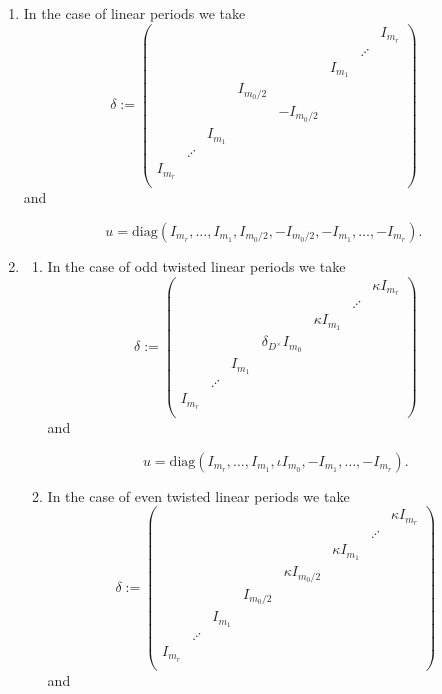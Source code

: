 \documentclass[11pt,letterpaper]{amsart}
\def\k{\kappa}
\def\diag{\mathrm{diag}}
\theoremstyle{plain}
\numberwithin{equation}{section}
\begin{document}
\begin{enumerate}[1)]
\item In the case of linear periods we take 
\[\delta:=\begin{pmatrix} &  & & & & &        & I_{m_r} \\
                         &  & & & & & \iddots &  \\ 
												&  & & & & I_{m_1} &  &  \\ 
									        &  & & I_{m_0/2} &  &     &   &  \\ 
													  &  & &   & -I_{m_0/2} &     &   &  \\ 
												    & & I_{m_1} & & &   &  & \\ 
												    & \iddots& & & &   &  &  \\ 
												  I_{m_r} & & & & &   &  &  \\ 
																							\end{pmatrix} \] and
																							
		\[u=\diag(I_{m_r},\dots,I_{m_1},I_{m_0/2},-I_{m_0/2},-I_{m_1},\dots,-I_{m_r}). \]
		\item 
\begin{enumerate} 
\item In the case of odd twisted linear periods we take 
\[\delta:=\begin{pmatrix}   & & & & &        & \k I_{m_r} \\
                          & & & & & \iddots &  \\ 
												  & & & & \k I_{m_1} &  &  \\ 
									          & & &\delta_{D^\times}  I_{m_0} &     &   &  \\
												    & & I_{m_1} & & &   &   \\ 
												    & \iddots& & & &   &    \\ 
												  I_{m_r} & & & & &   &    \\ 
																							\end{pmatrix} \] and
																							
		\[u=\diag(I_{m_r},\dots, I_{m_1},\iota I_{m_0},-I_{m_1},\dots,-I_{m_r}). \]
\item In the case of even twisted linear periods we take 
\[\delta:=\begin{pmatrix} &  & & & & &        & \k I_{m_r} \\
                         &  & & & & & \iddots &  \\ 
												&  & & & & \k I_{m_1} &  &  \\ 
									        &  & & & \k I_{m_0/2} &     &   &  \\ 
													  &  & &  I_{m_0/2} & &     &   &  \\ 
												    & & I_{m_1} & & &   &  & \\ 
												    & \iddots& & & &   &  &  \\ 
												  I_{m_r} & & & & &   &  &  \\ 
																							\end{pmatrix} \] and
																							

\end{enumerate}
\end{enumerate}
\end{document}

